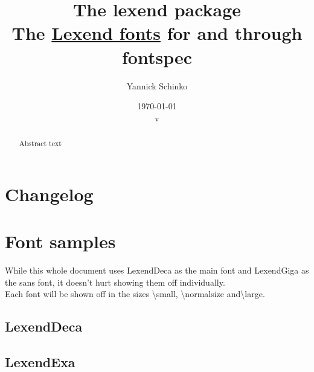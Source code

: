 \documentclass[oneside,a4paper]{ltxdoc}
\begin{document}
\title{
	The \textsf{lexend} package\\
	\large{The \href{https://www.lexend.com/}{\textsf{Lexend} fonts} for  and
	 through \textsf{fontspec}}
}
\author{
	Yannick Schinko
}
\date{
	\today\\
	v%
}

\maketitle

\bigskip

\begin{abstract}
Abstract text
\end{abstract}

\bigskip
\tableofcontents
\newpage


\section{Changelog}


\section{Font samples}

While this whole document uses LexendDeca as the main font and LexendGiga as the sans font, it
doesn't hurt showing them off individually.\\
Each font will be shown off in the sizes \textsf{\textbackslash{}small},
\textsf{\textbackslash{}normalsize} and\textsf{\textbackslash{}large}.

\subsection{LexendDeca}

\LexendDeca{
	\small{\blindtext}\bigskip

	\normalsize{\blindtext}\bigskip

	\large{\blindtext}
}

\subsection{LexendExa}

\LexendExa{
	\small{\blindtext}\bigskip

	\normalsize{\blindtext}\bigskip

	\large{\blindtext}
}
\end{document}
